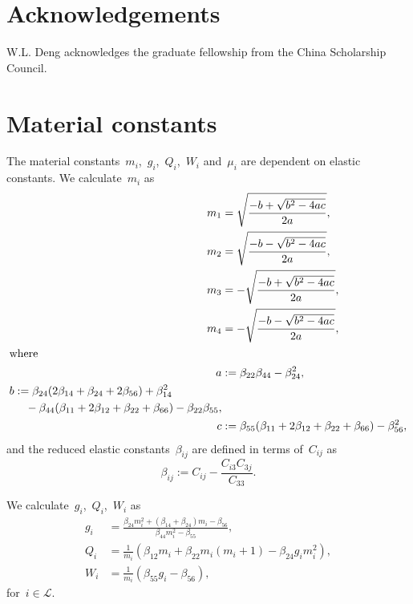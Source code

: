 \documentclass[preprint,10pt,times]{elsarticle}
\numberwithin{equation}{section}
\newcommand{\pr}[1]{\left( #1 \right)}
\renewcommand{\>}{$\Rightarrow$}
\begin{document}
\section*{Acknowledgements}
W.L. Deng acknowledges the graduate fellowship from the China Scholarship Council.


\newpage
\appendix

\section{Material constants}
\label{Appen:MatConst}
The material constants~$m_i$,~$g_i$,~$Q_i$,~$W_i$ and~$\mu_i$ are dependent on elastic constants.
We calculate~$m_i$ as
\begin{subequations}
	\begin{align}
	 m_1 & =  \sqrt{\frac{-b +\sqrt{b^2 - 4ac}}{2a}}, \\
	 m_2 & =  \sqrt{\frac{-b -\sqrt{b^2 - 4ac}}{2a}}, \\
	 m_3 & =  -\sqrt{\frac{-b +\sqrt{b^2 - 4ac}}{2a}}, \\
	 m_4 & =  -\sqrt{\frac{-b -\sqrt{b^2 - 4ac}}{2a}}, \\
	\intertext{where}
	 a & :=  \beta_{22} \beta_{44} - \beta_{24}^2, \\
	\begin{split}
	 b & := \beta_{24}(2\beta_{14} + \beta_{24} + 2\beta_{56}) + \beta_{14}^2 \\
	 & \quad - \beta_{44}(\beta_{11} + 2\beta_{12} + \beta_{22} + \beta_{66}) - \beta_{22} \beta_{55},
	\end{split} \\
	c & :=  \beta_{55}(\beta_{11} + 2\beta_{12} + \beta_{22} + \beta_{66})-\beta_{56}^2,
	\end{align}
\end{subequations}
and the reduced elastic constants~$\beta_{ij}$ are defined in terms of~$C_{ij}$ as
\begin{equation}
\beta_{ij} := C_{ij}-\frac{C_{i3} C_{3j}}{C_{33}}.
\end{equation}


We calculate~$g_i$,~$Q_i$,~$W_i$ as
\begin{subequations}
	\begin{align}
	g_i & = \frac{\beta_{24}m_i^2+(\beta_{14} + \beta_{24})m_i - \beta_{56}}{\beta_{44}m_i^2 - \beta_{55}}, \\
	Q_i & = \frac{1}{m_i} \pr{\beta_{12}m_i + \beta_{22}m_i(m_i+1) - \beta_{24} g_i m_i^2}, \\
	W_i & = \frac{1}{m_i}\pr{\beta_{55} g_i - \beta_{56}},
	\end{align}
\end{subequations}
for~$ i \in \mathcal{L}$.
\end{document}
